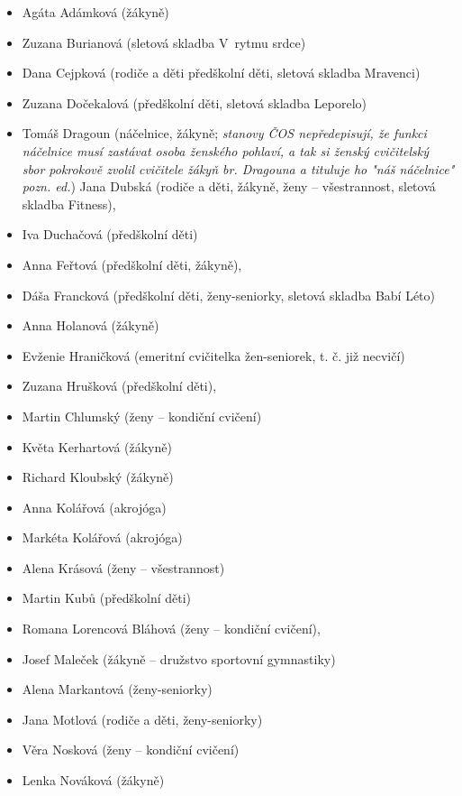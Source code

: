 \documentclass[a5paper, 11pt, twoside]{article}
\begin{document}
\begin{multicols}{2}
  \begin{itemize}[label={},itemindent=-2em,leftmargin=2em]
  \setlength{\itemsep}{-4pt}
  \item Agáta Adámková (žákyně)
  \item Zuzana Burianová (sletová skladba V~rytmu srdce)
  \item Dana Cejpková (rodiče a děti předškolní děti, sletová skladba Mravenci)
  \item Zuzana Dočekalová (předškolní děti, sletová skladba Leporelo)
  \item Tomáš Dragoun (náčelnice, žákyně; \textit{stanovy ČOS nepředepisují, že funkci náčelnice musí zastávat osoba ženského pohlaví, a tak  si ženský cvičitelský sbor pokrokově zvolil cvičitele žákyň br. Dragouna a tituluje ho "náš náčelnice" pozn. ed.}) Jana Dubská (rodiče a děti, žákyně, ženy -- všestrannost, sletová skladba Fitness),
  \item Iva Duchačová (předškolní děti)
  \item Anna Feřtová (předškolní děti, žákyně),
  \item Dáša Francková (předškolní děti, ženy-seniorky, sletová skladba Babí Léto)
  \item Anna Holanová (žákyně)
  \item Evženie Hraničková (emeritní cvičitelka žen-seniorek, t. č. již necvičí)
  \item Zuzana Hrušková (předškolní děti),
  \item Martin Chlumský (ženy -- kondiční cvičení)
  \item Květa Kerhartová (žákyně)
  \item Richard Kloubský (žákyně)
  \item Anna Kolářová (akrojóga)
  \item Markéta Kolářová (akrojóga)
  \item Alena Krásová (ženy -- všestrannost)
  \item Martin Kubů (předškolní děti)
  \item Romana Lorencová Bláhová (ženy -- kondiční cvičení),
  \item Josef Maleček (žákyně -- družstvo sportovní gymnastiky)
  \item Alena Markantová (ženy-seniorky)
  \item Jana Motlová (rodiče a děti, ženy-seniorky)
  \item Věra Nosková (ženy -- kondiční cvičení)
  \item Lenka Nováková (žákyně)

\end{itemize}
\end{multicols}
\end{document}
